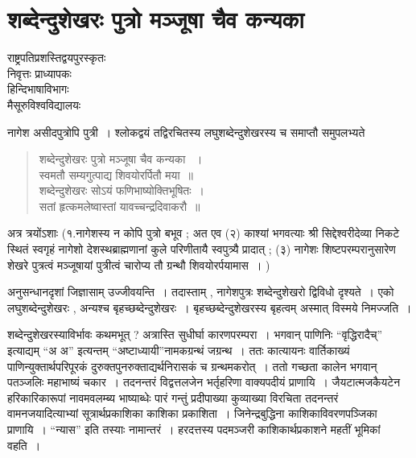 {\fontsize{15}{17}\selectfont
\presetvalues
\chapter{शब्देन्दुशेखरः पुत्रो मञ्जूषा चैव कन्यका}

\begin{center}
\smallskip

राष्ट्रपतिप्रशस्तिद्वयपुरस्कृतः\\
निवृत्तः प्राध्यापकः\\
हिन्दिभाषाविभागः\\
मैसूरुविश्वविद्यालयः
\addrule
\end{center}

नागेश असीदपुत्रोपि पुत्री~। श्लोकद्वयं तद्विरचितस्य लघुशब्देन्दुशेखरस्य च समाप्तौ समुपलभ्यते

\begin{verse}
शब्देन्दुशेखरः पुत्रो मञ्जूषा चैव कन्यका ~। \\
स्वमतौ सम्यगुत्पाद्य शिवयोरर्पितौ मया~॥\\
शब्देन्दुशेखरः सोऽयं फणिभाष्योक्तिभूषितः~। \\
सतां हृत्कमलेष्वास्तां यावच्चन्द्रदिवाकरौ~॥
\end{verse}

अत्र त्रयोंऽशाः (१.नागेशस्य न कोपि पुत्रो बभूव ; अत एव (२) काश्यां भगवत्याः श्री सिद्देश्वरीदेव्या निकटे स्थितं स्वगृहं नागेशो देशस्थब्राह्मणानां कुले परिणीतायै स्वपुत्र्यै प्रादात् ; (३) नागेशः शिष्टपरम्परानुसारेण शेखरे पुत्रत्वं मञ्जूषायां पुत्रीत्वं चारोप्य तौ ग्रन्थौ शिवयोरर्पयामास~। )  

अनुसन्धानदृशां जिज्ञासाम् उज्जीवयन्ति~। तदास्ताम् , नागेशपुत्रः शब्देन्दुशेखरो द्विविधो दृश्यते~। एको लघुशब्देन्दुशेखरः , अन्यश्च बृहच्छब्देन्दुशेखरः~। बृहच्छब्देन्दुशेखरस्य बृहत्वम् अस्मात् विस्मये निमज्जति~। 

शब्देन्दुशेखरस्याविर्भावः कथमभूत् ? अत्रास्ति सुधीर्घा कारणपरम्परा~। भगवान् पाणिनिः “वृद्धिरादैच्” इत्याद्यम् “अ अ” इत्यन्तम् “अष्टाध्यायी”नामकग्रन्थं जग्रन्थ~। ततः कात्यायनः वार्तिकाख्यं पाणिन्युक्तार्थपरिपूरकं दुरुक्तपुनरुक्ताद्यर्थनिरासकं च ग्रन्थमकरोत्~। ततो गच्छता कालेन भगवान् पतञ्जलिः महाभाष्यं चकार~। तदनन्तरं विद्वत्तलजेन भर्तृहरिणा वाक्यपदीयं प्राणायि~। जैयटात्मजकैयटेन हरिकारिकारूपां नावमवलम्ब्य भाष्याब्धेः पारं गन्तुं प्रदीपाख्या कुव्याख्या विरचिता तदनन्तरं वामनजयादित्याभ्यां सूत्रार्थप्रकाशिका काशिका प्रकाशिता~। जिनेन्द्रबुद्धिना काशिकाविवरणपञ्जिका प्राणायि~। “न्यास” इति तस्याः नामान्तरं~। हरदत्तस्य पदमञ्जरी काशिकार्थप्रकाशने महतीं भूमिकां वहति~। 

}
